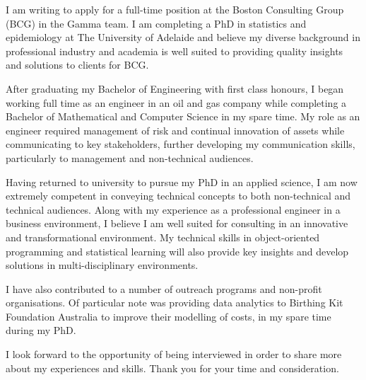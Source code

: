 \documentclass[10pt,stdletter,dateno,sigleft]{newlfm} %
\begin{document}
\begin{newlfm}


I am writing to apply for a full-time position at the Boston Consulting Group (BCG) in the Gamma team. I am completing a PhD in statistics and epidemiology at The University of Adelaide and believe my diverse background in professional industry and academia is well suited to providing quality insights and solutions to clients for BCG.

 After graduating my Bachelor of Engineering with first class honours, I began working full time as an engineer in an oil and gas company while completing a Bachelor of Mathematical and Computer Science in my spare time. My role as an engineer required management of risk and continual innovation of assets while communicating to key stakeholders, further developing my communication skills, particularly to management and non-technical audiences. 

Having returned to university to pursue my PhD in an applied science, I am now extremely competent in conveying technical concepts to both non-technical and technical audiences. Along with my experience as a professional engineer in a business environment, I believe I am well suited for consulting in an innovative and transformational environment. My technical skills in object-oriented programming and statistical learning will also provide key insights and develop solutions in multi-disciplinary environments.

I have also contributed to a number of outreach programs and non-profit organisations. Of particular note was providing data analytics to Birthing Kit Foundation Australia to improve their modelling of costs, in my spare time during my PhD.

I look forward to the opportunity of being interviewed in order to share more about my experiences and skills. Thank you for your time and consideration.


\end{newlfm}
\end{document}
